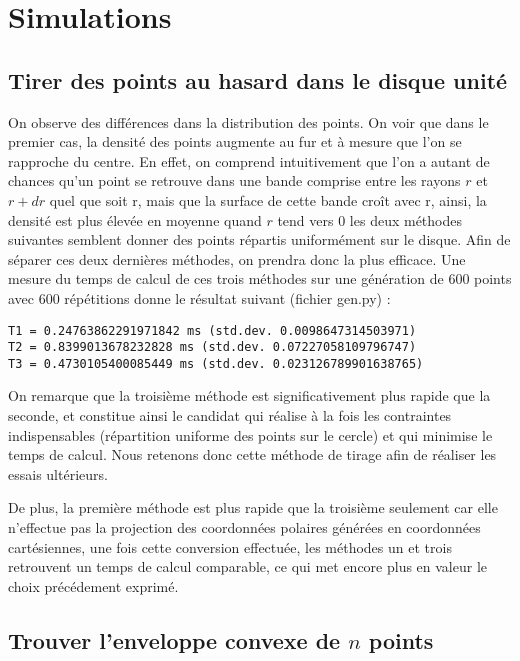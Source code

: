 \documentclass[a4paper,12pt,twoside]{article}
\begin{document}
\section{Simulations}
	\subsection{Tirer des points au hasard dans le disque unité}
		On observe des différences dans la distribution des points. On voir que dans le premier cas, la densité des points augmente au fur et à mesure que l'on se rapproche du centre. En effet, on comprend intuitivement que l'on a autant de chances qu'un point se retrouve dans une bande comprise entre les rayons $r$ et $r + dr$ quel que soit r, mais que la surface de cette bande croît avec r, ainsi, la densité est plus élevée en moyenne quand $r$ tend vers $0$ les deux méthodes suivantes semblent donner des points répartis uniformément sur le disque.
		Afin de séparer ces deux dernières méthodes, on prendra donc la plus efficace. Une mesure du temps de calcul de ces trois méthodes sur une génération de 600 points avec 600 répétitions donne le résultat suivant (fichier gen.py) : 
		\begin{verbatim}T1 = 0.24763862291971842 ms (std.dev. 0.0098647314503971)
T2 = 0.8399013678232828 ms (std.dev. 0.07227058109796747)
T3 = 0.4730105400085449 ms (std.dev. 0.023126789901638765)
\end{verbatim}
		On remarque que la troisième méthode est significativement plus rapide que la seconde, et constitue ainsi le candidat qui réalise à la fois les contraintes indispensables (répartition uniforme des points sur le cercle) et qui minimise le temps de calcul. Nous retenons donc cette méthode de tirage afin de réaliser les essais ultérieurs.

		De plus, la première méthode est plus rapide que la troisième seulement car elle n'effectue pas la projection des coordonnées polaires générées en coordonnées cartésiennes, une fois cette conversion effectuée, les méthodes un et trois retrouvent un temps de calcul comparable, ce qui met encore plus en valeur le choix précédement exprimé.

	\subsection{Trouver l'enveloppe convexe de $n$ points}
\end{document}
